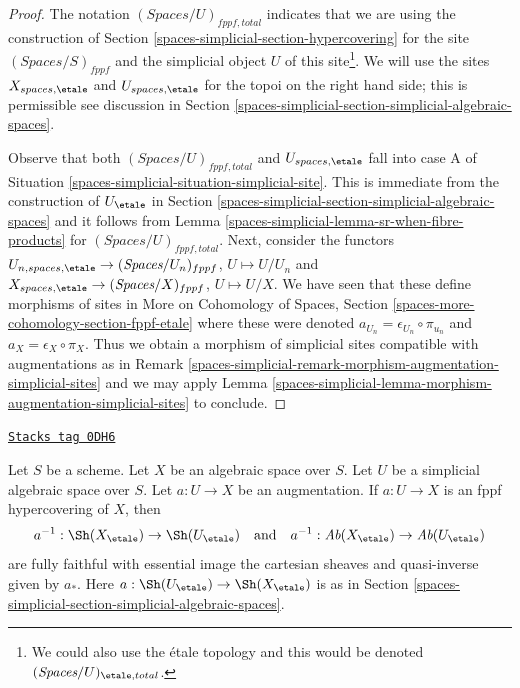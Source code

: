 \begin{proof}
The notation $(\textit{Spaces}/U)_{fppf, total}$ indicates that
we are using the construction of
Section \ref{spaces-simplicial-section-hypercovering}
for the site $(\textit{Spaces}/S)_{fppf}$ and the
simplicial object $U$ of this site\footnote{We could also
use the \'etale topology and this would be denoted
$(\textit{Spaces}/U)_{\etale, total}$.}.
We will use the sites $X_{spaces, \etale}$ and $U_{spaces, \etale}$
for the topoi on the right hand side; this is permissible
see discussion in Section \ref{spaces-simplicial-section-simplicial-algebraic-spaces}.

\medskip\noindent
Observe that both $(\textit{Spaces}/U)_{fppf, total}$ and
$U_{spaces, \etale}$
fall into case A of Situation \ref{spaces-simplicial-situation-simplicial-site}.
This is immediate from the construction of
$U_\etale$ in Section \ref{spaces-simplicial-section-simplicial-algebraic-spaces}
and it follows from Lemma \ref{spaces-simplicial-lemma-sr-when-fibre-products}
for $(\textit{Spaces}/U)_{fppf, total}$.
Next, consider the functors
$U_{n, spaces, \etale} \to (\textit{Spaces}/U_n)_{fppf}$, $U \mapsto U/U_n$
and
$X_{spaces, \etale} \to (\textit{Spaces}/X)_{fppf}$, $U \mapsto U/X$.
We have seen that these define morphisms of sites in
More on Cohomology of Spaces, Section
\ref{spaces-more-cohomology-section-fppf-etale}
where these were denoted $a_{U_n} = \epsilon_{U_n} \circ \pi_{u_n}$
and $a_X = \epsilon_X \circ \pi_X$.
Thus we obtain a morphism of simplicial sites compatible with
augmentations as in Remark \ref{spaces-simplicial-remark-morphism-augmentation-simplicial-sites}
and we may apply
Lemma \ref{spaces-simplicial-lemma-morphism-augmentation-simplicial-sites} to conclude.
\end{proof}

\begin{lemma}
\label{spaces-simplicial-lemma-descent-sheaves-for-fppf-hypercovering}
\href{https://stacks.math.columbia.edu/tag/0DH6}{\texttt{Stacks tag 0DH6}}

Let $S$ be a scheme. Let $X$ be an algebraic space over $S$.
Let $U$ be a simplicial algebraic space over $S$. Let $a : U \to X$
be an augmentation. If $a : U \to X$ is an fppf hypercovering of $X$,
then
$$
a^{-1} : \Sh(X_\etale) \to \Sh(U_\etale)
\quad\text{and}\quad
a^{-1} : \textit{Ab}(X_\etale) \to \textit{Ab}(U_\etale)
$$
are fully faithful with essential image the cartesian sheaves and
quasi-inverse given by $a_*$. Here $a : \Sh(U_\etale) \to \Sh(X_\etale)$
is as in Section \ref{spaces-simplicial-section-simplicial-algebraic-spaces}.
\end{lemma}

